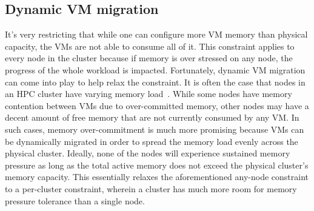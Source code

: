 \subsection{Dynamic VM migration}
It's very restricting that while one can configure more VM memory than physical capacity, the VMs are not able to consume all of it. This constraint applies to every node in the cluster because if memory is over stressed on any 
node, the progress of the whole workload is impacted. 
Fortunately, dynamic VM migration can come into play to help relax the constraint. 
It is often the case that nodes in an HPC cluster have varying memory load~\cite{gupta2013improving,boneti2008dynamic}. While some nodes have memory contention 
between VMs due to over-committed memory, other nodes may have a decent amount of free memory that are not currently consumed by any VM. In such cases, memory over-commitment 
is much more promising because VMs can be dynamically migrated 
in order to  
spread the memory load evenly across the physical cluster. Ideally, none of the nodes will experience sustained memory pressure as long as 
the total active memory does not exceed the physical cluster's memory capacity. This essentially relaxes the aforementioned  
any-node constraint to a per-cluster constraint, wherein a cluster has much more room for memory pressure tolerance than a single node. 
